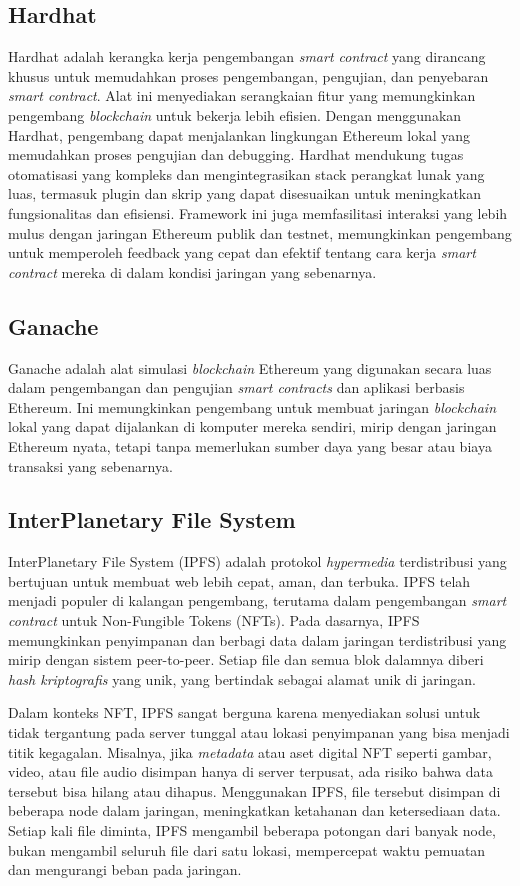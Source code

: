 \subsection{Hardhat}
Hardhat adalah kerangka kerja pengembangan \emph{smart contract} yang dirancang khusus untuk memudahkan proses pengembangan, pengujian, dan penyebaran \emph{smart contract}. Alat ini menyediakan serangkaian fitur yang memungkinkan pengembang \emph{blockchain} untuk bekerja lebih efisien. Dengan menggunakan Hardhat, pengembang dapat menjalankan lingkungan Ethereum lokal yang memudahkan proses pengujian dan debugging. Hardhat mendukung tugas otomatisasi yang kompleks dan mengintegrasikan stack perangkat lunak yang luas, termasuk plugin dan skrip yang dapat disesuaikan untuk meningkatkan fungsionalitas dan efisiensi. Framework ini juga memfasilitasi interaksi yang lebih mulus dengan jaringan Ethereum publik dan testnet, memungkinkan pengembang untuk memperoleh feedback yang cepat dan efektif tentang cara kerja \emph{smart contract} mereka di dalam kondisi jaringan yang sebenarnya.

\subsection{Ganache}

Ganache adalah alat simulasi \emph{blockchain} Ethereum yang digunakan secara luas dalam pengembangan dan pengujian \emph{smart contracts} dan aplikasi berbasis Ethereum. Ini memungkinkan pengembang untuk membuat jaringan \emph{blockchain} lokal yang dapat dijalankan di komputer mereka sendiri, mirip dengan jaringan Ethereum nyata, tetapi tanpa memerlukan sumber daya yang besar atau biaya transaksi yang sebenarnya.

\subsection{InterPlanetary File System}
InterPlanetary File System (IPFS) adalah protokol \emph{hypermedia} terdistribusi yang bertujuan untuk membuat web lebih cepat, aman, dan terbuka. IPFS telah menjadi populer di kalangan pengembang, terutama dalam pengembangan \emph{smart contract} untuk Non-Fungible Tokens (NFTs). Pada dasarnya, IPFS memungkinkan penyimpanan dan berbagi data dalam jaringan terdistribusi yang mirip dengan sistem peer-to-peer. Setiap file dan semua blok dalamnya diberi \emph{\emph{hash} kriptografis} yang unik, yang bertindak sebagai alamat unik di jaringan.

Dalam konteks NFT, IPFS sangat berguna karena menyediakan solusi untuk tidak tergantung pada server tunggal atau lokasi penyimpanan yang bisa menjadi titik kegagalan. Misalnya, jika \emph{metadata} atau aset digital NFT seperti gambar, video, atau file audio disimpan hanya di server terpusat, ada risiko bahwa data tersebut bisa hilang atau dihapus. Menggunakan IPFS, file tersebut disimpan di beberapa node dalam jaringan, meningkatkan ketahanan dan ketersediaan data. Setiap kali file diminta, IPFS mengambil beberapa potongan dari banyak node, bukan mengambil seluruh file dari satu lokasi, mempercepat waktu pemuatan dan mengurangi beban pada jaringan.

